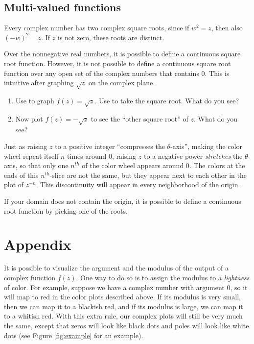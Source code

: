 \subsection*{Multi-valued functions}
Every complex number has two complex square roots, since if $w^2=z$, then also $(-w)^2=z$.
If $z$ is not zero, these roots are distinct.

Over the nonnegative real numbers, it is possible to define a continuous square root function.
However, it is not possible to define a continuous square root function over any open set of the complex numbers that contains 0.
This is intuitive after graphing $\sqrt{z}$ on the complex plane.

\begin{problem}
\begin{enumerate}
\item Use  to graph $f(z) = \sqrt{z}$.
Use  to take the square root.
What do you see?
\item Now plot $f(z) = -\sqrt{z}$ to see the ``other square root'' of $z$. What do you see?
\end{enumerate}
\end{problem}

Just as raising $z$ to a positive integer ``compresses the $\theta$-axis'', making the color wheel repeat itself $n$ times around 0, raising $z$ to a negative power \emph{stretches} the $\theta$-axis, so that only one $n^{th}$ of the color wheel appears around 0.
The colors at the ends of this $n^{th}$-slice are not the same, but they appear next to each other in the plot of $z^{-n}$.
This discontinuity will appear in every neighborhood of the origin. 


If your domain does not contain the origin, it is possible to define a continuous root function by picking one of the roots.


\section*{Appendix}
It is possible to visualize the argument and the modulus of the output of a complex function $f(z)$. 
One way to do so is to assign the modulus to a \emph{lightness} of color.
For example, suppose we have a complex number with argument 0, so it will map to red in the color plots described above.
If its modulus is very small, then we can map it to a blackish red, and if its modulus is large, we can map it to a whitish red.
With this extra rule, our complex plots will still be very much the same, except that zeros will look like black dots and poles will look like white dots (see Figure \ref{fig:example} for an example).


